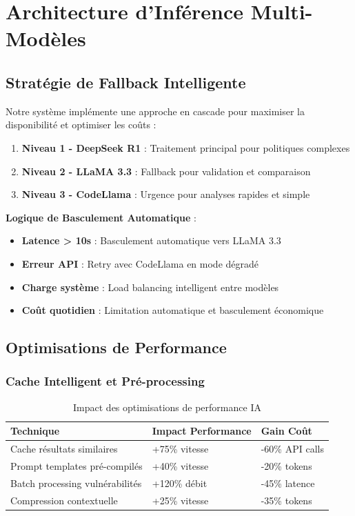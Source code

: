 \documentclass[12pt,a4paper]{report}
\begin{document}
\section{Architecture d'Inférence Multi-Modèles}

\subsection{Stratégie de Fallback Intelligente}

Notre système implémente une approche en cascade pour maximiser la disponibilité et optimiser les coûts :

\begin{enumerate}
    \item \textbf{Niveau 1 - DeepSeek R1} : Traitement principal pour politiques complexes
    \item \textbf{Niveau 2 - LLaMA 3.3} : Fallback pour validation et comparaison
    \item \textbf{Niveau 3 - CodeLlama} : Urgence pour analyses rapides et simple
\end{enumerate}

\textbf{Logique de Basculement Automatique} :
\begin{itemize}
    \item \textbf{Latence > 10s} : Basculement automatique vers LLaMA 3.3
    \item \textbf{Erreur API} : Retry avec CodeLlama en mode dégradé
    \item \textbf{Charge système} : Load balancing intelligent entre modèles
    \item \textbf{Coût quotidien} : Limitation automatique et basculement économique
\end{itemize}

\subsection{Optimisations de Performance}

\subsubsection{Cache Intelligent et Pré-processing}

\begin{table}[H]
    \centering
    \begin{tabularx}{\textwidth}{|X|X|X|}
        \hline
        \textbf{Technique} & \textbf{Impact Performance} & \textbf{Gain Coût} \\
        \hline
        Cache résultats similaires & +75\% vitesse & -60\% API calls \\
        \hline
        Prompt templates pré-compilés & +40\% vitesse & -20\% tokens \\
        \hline
        Batch processing vulnérabilités & +120\% débit & -45\% latence \\
        \hline
        Compression contextuelle & +25\% vitesse & -35\% tokens \\
        \hline
    \end{tabularx}
    \caption{Impact des optimisations de performance IA}
\end{table}
\end{document}
